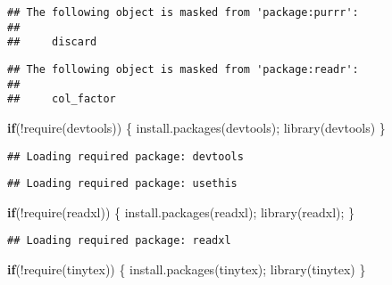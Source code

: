 \documentclass[
]{article}
\newenvironment{Shaded}{\begin{snugshade}}{\end{snugshade}}
\newcommand{\ControlFlowTok}[1]{\textcolor[rgb]{0.13,0.29,0.53}{\textbf{#1}}}
\newcommand{\FunctionTok}[1]{\textcolor[rgb]{0.00,0.00,0.00}{#1}}
\newcommand{\NormalTok}[1]{#1}
\newcommand{\SpecialCharTok}[1]{\textcolor[rgb]{0.00,0.00,0.00}{#1}}
\newcommand{\StringTok}[1]{\textcolor[rgb]{0.31,0.60,0.02}{#1}}
\begin{document}
\begin{verbatim}
## The following object is masked from 'package:purrr':
## 
##     discard
\end{verbatim}

\begin{verbatim}
## The following object is masked from 'package:readr':
## 
##     col_factor
\end{verbatim}

\begin{Shaded}
\begin{Highlighting}[]
\ControlFlowTok{if}\NormalTok{(}\SpecialCharTok{!}\FunctionTok{require}\NormalTok{(}\StringTok{\textquotesingle{}devtools\textquotesingle{}}\NormalTok{))}
\NormalTok{\{}
\FunctionTok{install.packages}\NormalTok{(}\StringTok{\textquotesingle{}devtools\textquotesingle{}}\NormalTok{);}
  \FunctionTok{library}\NormalTok{(devtools)}
\NormalTok{\}}
\end{Highlighting}
\end{Shaded}

\begin{verbatim}
## Loading required package: devtools
\end{verbatim}

\begin{verbatim}
## Loading required package: usethis
\end{verbatim}

\begin{Shaded}
\begin{Highlighting}[]
\ControlFlowTok{if}\NormalTok{(}\SpecialCharTok{!}\FunctionTok{require}\NormalTok{(}\StringTok{\textquotesingle{}readxl\textquotesingle{}}\NormalTok{))}
\NormalTok{\{}
  \FunctionTok{install.packages}\NormalTok{(}\StringTok{\textquotesingle{}readxl\textquotesingle{}}\NormalTok{);}
  \FunctionTok{library}\NormalTok{(readxl);}
\NormalTok{\}}
\end{Highlighting}
\end{Shaded}

\begin{verbatim}
## Loading required package: readxl
\end{verbatim}

\begin{Shaded}
\begin{Highlighting}[]
\ControlFlowTok{if}\NormalTok{(}\SpecialCharTok{!}\FunctionTok{require}\NormalTok{(}\StringTok{\textquotesingle{}tinytex\textquotesingle{}}\NormalTok{))}
\NormalTok{\{}
  \FunctionTok{install.packages}\NormalTok{(}\StringTok{\textquotesingle{}tinytex\textquotesingle{}}\NormalTok{);}
  \FunctionTok{library}\NormalTok{(tinytex)}
\NormalTok{\} }
\end{Highlighting}
\end{Shaded}
\end{document}
